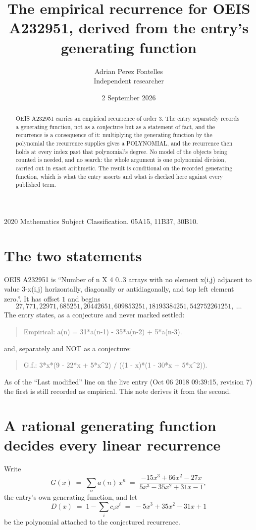\documentclass[11pt,a4paper]{article}
\title{The empirical recurrence for OEIS A232951, derived from the entry's generating function}
\author{Adrian Perez Fontelles\\ \small Independent researcher}
\date{2 September 2026}
\theoremstyle{plain}
\theoremstyle{definition}
\begin{document}
\maketitle

\begin{abstract}
OEIS A232951 carries an empirical recurrence of order $3$. The entry separately records a
generating function, not as a conjecture but as a statement of fact, and the recurrence is a
consequence of it: multiplying the generating function by the polynomial the recurrence
supplies gives a POLYNOMIAL, and the recurrence then holds at every index past that
polynomial's degree. No model of the objects being counted is needed, and no search: the
whole argument is one polynomial division, carried out in exact arithmetic. The result is
conditional on the recorded generating function, which is what the entry asserts and what is
checked here against every published term.
\end{abstract}

\noindent\small 2020 Mathematics Subject Classification. 05A15, 11B37, 30B10.\normalsize

\section{The two statements}

OEIS A232951 is ``Number of n X 4 0..3 arrays with no element x(i,j) adjacent to value 3-x(i,j) horizontally, diagonally or antidiagonally, and top left element zero.''. It has offset $1$ and begins
\[
27, 771, 22971, 685251, 20442651, 609853251, 18193384251, 542752261251,\ \dots
\]
The entry states, as a conjecture and never marked settled:
\begin{quote}
Empirical: a(n) = 31*a(n-1) - 35*a(n-2) + 5*a(n-3).
\end{quote}
and, separately and NOT as a conjecture:
\begin{quote}
G.f.: 3*x*(9 - 22*x + 5*x\^{}2) / ((1 - x)*(1 - 30*x + 5*x\^{}2)).
\end{quote}
As of the ``Last modified'' line on the live entry (Oct 06 2018 09:39:15, revision 7) the first is still
recorded as empirical. This note derives it from the second.

\section{A rational generating function decides every linear recurrence}

Write
\[
G(x)\;=\;\sum_{n}a(n)\,x^{n}\;=\;\frac{- 15 x^{3} + 66 x^{2} - 27 x}{5 x^{3} - 35 x^{2} + 31 x - 1},
\]
the entry's own generating function, and let
\[
D(x)\;=\;1-\sum_i c_i x^{i}\;=\;- 5 x^{3} + 35 x^{2} - 31 x + 1
\]
be the polynomial attached to the conjectured recurrence.
\end{document}
